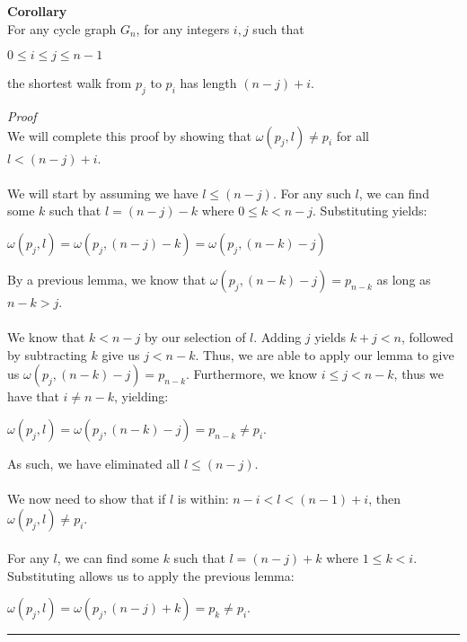 \documentclass[a4paper,12pt]{article}
\begin{document}
\label{corollary:shortest_walk_2}
\begin{tcolorbox}
\textbf{Corollary}\\
For any cycle graph $G_n$, for any integers $i, j$ such that
\begin{center}
$0 \leq i \leq j \leq n - 1$
\end{center}
the shortest walk from $p_j$ to $p_i$ has length $(n - j) + i$.
\end{tcolorbox}
\noindent
\textit{Proof}\\
We will complete this proof by showing that $\omega(p_j, l) \neq p_i$ for all $l < (n - j) + i$.\\
\\
We will start by assuming we have $l \leq (n - j)$. For any such $l$, we can find some $k$ such that $l = (n - j) - k$ where $0 \leq k < n - j$. Substituting yields:
\begin{center}
$\omega(p_j, l) = \omega(p_j, (n - j) - k) = \omega(p_j, (n - k) - j)$
\end{center}
By a previous lemma, we know that $\omega(p_j, (n - k) - j) = p_{n - k}$ as long as $n - k > j$.\\
\\
We know that $k < n - j$ by our selection of $l$. Adding $j$ yields $k + j < n$, followed by subtracting $k$ give us $j < n - k$. Thus, we are able to apply our lemma to give us $\omega(p_j, (n - k) - j) = p_{n - k}$. Furthermore, we know $i \leq j < n - k$, thus we have that $i \neq n - k$, yielding:
\begin{center}
$\omega(p_j, l) = \omega(p_j, (n - k) - j) = p_{n-k} \neq p_i$.
\end{center}
As such, we have eliminated all $l \leq (n - j)$.\\
\\
We now need to show that if $l$ is within: $n - i < l < (n-1) + i$, then $\omega(p_j, l) \neq p_i$.\\
\\
For any $l$, we can find some $k$ such that $l = (n - j) + k$ where $1 \leq k < i$. Substituting allows us to apply the previous lemma:
\begin{center}
$\omega(p_j, l) = \omega(p_j, (n - j) + k) = p_k \neq p_i$.
\end{center}

\begin{center}
\noindent\rule{8cm}{0.4pt}
\end{center}
\end{document}
